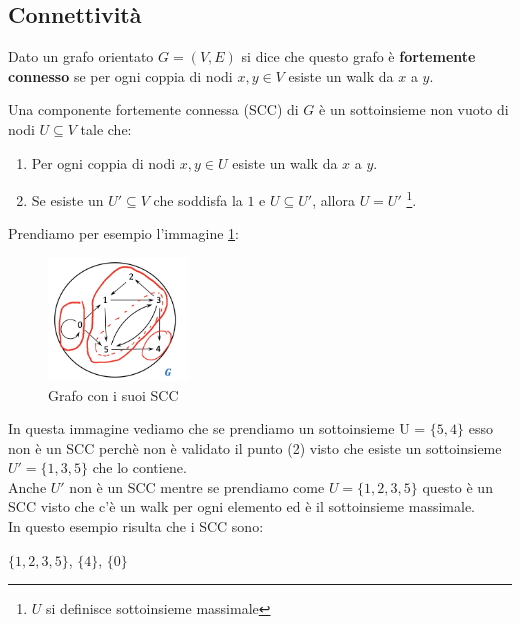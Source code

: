 \subsection{Connettività}
\begin{definition}\label{grafo-fortemente-connesso}
    Dato un grafo orientato $G = (V,E)$ si dice che questo grafo è \textbf{fortemente connesso} se per ogni coppia di nodi $x,y \in V$ esiste un walk da $x$ a $y$.
\end{definition}
\begin{definition}\label{componente-fortemente-connesso}
    Una componente fortemente connessa (SCC) di $G$ è un sottoinsieme non vuoto di nodi $U \subseteq V$ tale che:
    \begin{enumerate}
        \item Per ogni coppia di nodi $x,y \in U$ esiste un walk da $x$ a $y$.
        \item Se esiste un $U' \subseteq V$ che soddisfa la $1$ e $U \subseteq U'$, allora $U = U'$ \footnote{$U$ si definisce sottoinsieme massimale}.
    \end{enumerate}
\end{definition}
\begin{example}
    Prendiamo per esempio l'immagine \ref{fig:esempio-SCC}:
\end{example}
\begin{figure}
    \vspace{-10pt}
    \centering
    \includegraphics[width=3.7cm]{images/esempio-SCC.png}
    \caption{Grafo con i suoi SCC}
    \label{fig:esempio-SCC}
\end{figure}
In questa immagine vediamo che se prendiamo un sottoinsieme U = $\{5,4\}$ esso non è un SCC perchè non è validato il punto (2) visto che esiste un sottoinsieme $U' = \{1,3,5\}$ che lo contiene. \\Anche $U'$ non è un SCC mentre se prendiamo come $U = \{1,2,3,5\}$ questo è un SCC visto che c'è un walk per ogni elemento ed è il sottoinsieme massimale.\\
In questo esempio risulta che i SCC sono: 
\begin{center}
    $\{1,2,3,5\}$, $\{4\}$, $\{0\}$
\end{center}

